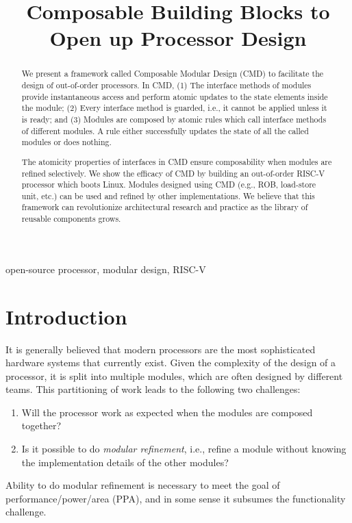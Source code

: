 \documentclass[conference]{IEEEtran}
\begin{document}
\title{Composable Building Blocks to Open up Processor Design}

\author{
}

\maketitle

\thispagestyle{plain}
\pagestyle{plain}

\begin{abstract}
    We present a framework called Composable Modular Design (CMD) to facilitate the design of out-of-order processors. In CMD, (1) The interface methods of modules provide instantaneous access and perform atomic updates to the state elements inside the module; (2) Every interface method is guarded, i.e., it cannot be applied unless it is ready; and (3) Modules are composed by atomic rules which call interface methods of different modules. A rule either successfully updates the state of all the called modules or does nothing.
    
    The atomicity properties of interfaces in CMD ensure composability when modules are refined selectively. We show the efficacy of CMD by building an out-of-order RISC-V processor which boots Linux. Modules designed using CMD (e.g., ROB, load-store unit, etc.) can be used and refined by other implementations. We believe that this framework can revolutionize architectural research and practice as the library of reusable components grows.
\end{abstract}

\begin{IEEEkeywords}
    open-source processor, modular design, RISC-V
\end{IEEEkeywords}

\section{Introduction}\label{sec:intro}
It is generally believed that modern processors are the most sophisticated hardware systems that currently exist.
Given the complexity of the design of a processor, it is split into multiple modules, which are often designed by different teams.
This partitioning of work leads to the following two challenges:
\begin{enumerate}
    \item Will the processor work as expected when the modules are composed together?
    \item Is it possible to do \emph{modular refinement}, i.e., refine a module without knowing the implementation details of the other modules?
\end{enumerate}
Ability to do modular refinement is necessary to meet the goal of performance/power/area (PPA), and in some sense it subsumes the functionality challenge. 
\end{document}
